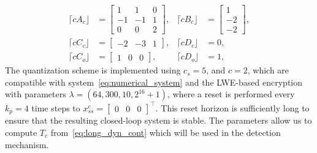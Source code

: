 \documentclass[journal, twoside, web]{ieeecolorpreprint}
\begin{document}
\begin{equation*}
\begin{aligned}
    \lceil cA_c \rfloor & = \begin{bmatrix}
     1 &  1 & 0  \\
      -1 & -1 & 1 \\
      0 & 0 & 2
    \end{bmatrix}, & \lceil cB_c \rfloor & = \begin{bmatrix}
            1 \\
            -2 \\
     -2 \end{bmatrix}, \\
     \lceil cC_c \rfloor & = \begin{bmatrix}
        -2 &-3 &  1
    \end{bmatrix}, &  \lceil c D_c \rfloor & = 0, \\ 
    \lceil cC_o \rfloor & = \begin{bmatrix}
        1 & 0 &  0
    \end{bmatrix}, &  \lceil cD_o \rfloor & = 1,
\end{aligned}
\end{equation*}
The quantization scheme is implemented using $c_s=5$, and $c=2$, which are compatible with system~\eqref{eq:numerical_system} and the LWE-based encryption with parameters $\lambda=(64,300,10,2^{16}+1)$, where a reset is performed every $k_p=4$ time steps to $x^c_{ss}=\begin{bmatrix}
    0 & 0 & 0
\end{bmatrix}^\top$. This reset horizon is sufficiently long to ensure that the resulting closed-loop system is stable. The parameters allow us to compute $T_c$ from~\eqref{eq:long_dyn_cont} which will be used in the detection mechanism.

\end{document}
